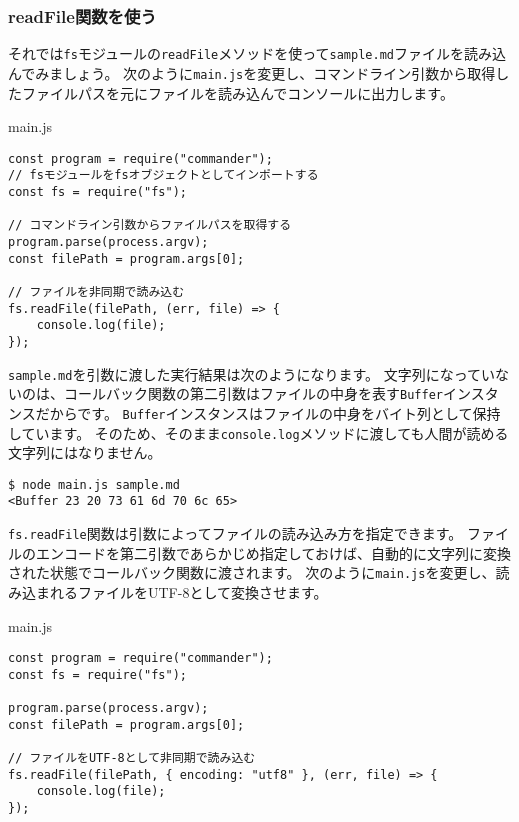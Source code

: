 \hypertarget{use-readFile}{%
\subsubsection{readFile関数を使う}\label{use-readFile}}

それでは\texttt{fs}モジュールの\texttt{readFile}メソッドを使って\texttt{sample.md}ファイルを読み込んでみましょう。
次のように\texttt{main.js}を変更し、コマンドライン引数から取得したファイルパスを元にファイルを読み込んでコンソールに出力します。

\begin{listtitle}
main.js
\end{listtitle}
\begin{lstlisting}
const program = require("commander");
// fsモジュールをfsオブジェクトとしてインポートする
const fs = require("fs");

// コマンドライン引数からファイルパスを取得する
program.parse(process.argv);
const filePath = program.args[0];

// ファイルを非同期で読み込む
fs.readFile(filePath, (err, file) => {
    console.log(file);
});
\end{lstlisting}
\listend

\texttt{sample.md}を引数に渡した実行結果は次のようになります。
文字列になっていないのは、コールバック関数の第二引数はファイルの中身を表す\texttt{Buffer}インスタンスだからです。
\texttt{Buffer}インスタンスはファイルの中身をバイト列として保持しています。
そのため、そのまま\texttt{console.log}メソッドに渡しても人間が読める文字列にはなりません。

\begin{lstlisting}
$ node main.js sample.md
<Buffer 23 20 73 61 6d 70 6c 65>
\end{lstlisting}

\texttt{fs.readFile}関数は引数によってファイルの読み込み方を指定できます。
ファイルのエンコードを第二引数であらかじめ指定しておけば、自動的に文字列に変換された状態でコールバック関数に渡されます。
次のように\texttt{main.js}を変更し、読み込まれるファイルをUTF-8として変換させます。

\begin{listtitle}
main.js
\end{listtitle}
\begin{lstlisting}
const program = require("commander");
const fs = require("fs");

program.parse(process.argv);
const filePath = program.args[0];

// ファイルをUTF-8として非同期で読み込む
fs.readFile(filePath, { encoding: "utf8" }, (err, file) => {
    console.log(file);
});
\end{lstlisting}
\listend

